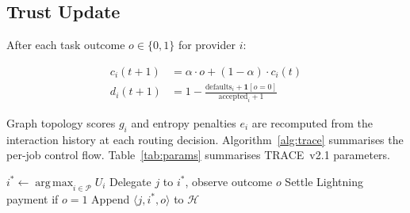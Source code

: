 \documentclass[sigconf,nonacm,10pt]{acmart}
\DeclareMathOperator*{\argmax}{arg\,max}
\begin{document}
\subsection{Trust Update}

After each task outcome $o \in \{0, 1\}$ for provider $i$:

\begin{align}
  c_i(t+1) &= \alpha \cdot o + (1 - \alpha) \cdot c_i(t)
              \label{eq:ema}\\
  d_i(t+1) &= 1 -
    \frac{\text{defaults}_i + \mathbf{1}[o=0]}
         {\text{accepted}_i + 1}
    \label{eq:default}
\end{align}

Graph topology scores $g_i$ and entropy penalties $e_i$ are
recomputed from the interaction history at each routing decision.
Algorithm~\ref{alg:trace} summarises the per-job control flow.
Table~\ref{tab:params} summarises TRACE~v2.1 parameters.

\begin{algorithm}[t]
\SetAlgoLined
\DontPrintSemicolon
{}
\BlankLine
{}
$i^* \leftarrow \argmax_{i \in \mathcal{P}} U_i$\;
Delegate $j$ to $i^*$, observe outcome $o$\;
Settle Lightning payment if $o = 1$\;
Append $\langle j, i^*, o\rangle$ to $\mathcal{H}$\;
\;
\caption{TRACE per-job routing loop.}
\label{alg:trace}
\end{algorithm}
\end{document}
